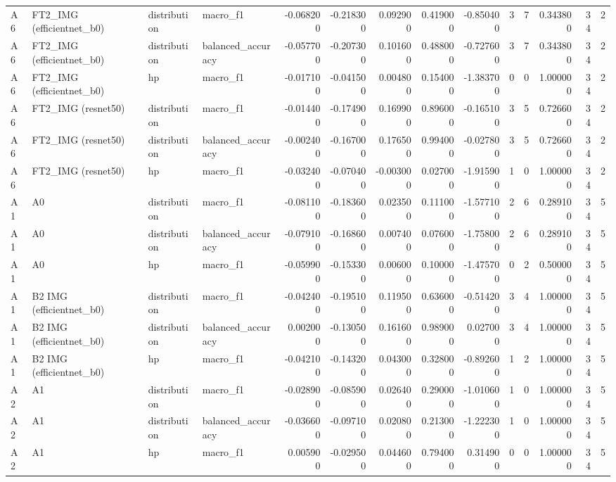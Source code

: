 \begin{table}
\begin{tabular}{llllrrrrrrrrrr}
A6 & FT2\_IMG (efficientnet\_b0) & distribution & macro\_f1 & -0.068200 & -0.218300 & 0.092900 & 0.419000 & -0.850400 & 3 & 7 & 0.343800 & 34 & 2 \\
A6 & FT2\_IMG (efficientnet\_b0) & distribution & balanced\_accuracy & -0.057700 & -0.207300 & 0.101600 & 0.488000 & -0.727600 & 3 & 7 & 0.343800 & 34 & 2 \\
A6 & FT2\_IMG (efficientnet\_b0) & hp & macro\_f1 & -0.017100 & -0.041500 & 0.004800 & 0.154000 & -1.383700 & 0 & 0 & 1.000000 & 34 & 2 \\
A6 & FT2\_IMG (resnet50) & distribution & macro\_f1 & -0.014400 & -0.174900 & 0.169900 & 0.896000 & -0.165100 & 3 & 5 & 0.726600 & 34 & 2 \\
A6 & FT2\_IMG (resnet50) & distribution & balanced\_accuracy & -0.002400 & -0.167000 & 0.176500 & 0.994000 & -0.027800 & 3 & 5 & 0.726600 & 34 & 2 \\
A6 & FT2\_IMG (resnet50) & hp & macro\_f1 & -0.032400 & -0.070400 & -0.003000 & 0.027000 & -1.915900 & 1 & 0 & 1.000000 & 34 & 2 \\
A1 & A0 & distribution & macro\_f1 & -0.081100 & -0.183600 & 0.023500 & 0.111000 & -1.577100 & 2 & 6 & 0.289100 & 34 & 5 \\
A1 & A0 & distribution & balanced\_accuracy & -0.079100 & -0.168600 & 0.007400 & 0.076000 & -1.758000 & 2 & 6 & 0.289100 & 34 & 5 \\
A1 & A0 & hp & macro\_f1 & -0.059900 & -0.153300 & 0.006000 & 0.100000 & -1.475700 & 0 & 2 & 0.500000 & 34 & 5 \\
A1 & B2 IMG (efficientnet\_b0) & distribution & macro\_f1 & -0.042400 & -0.195100 & 0.119500 & 0.636000 & -0.514200 & 3 & 4 & 1.000000 & 34 & 5 \\
A1 & B2 IMG (efficientnet\_b0) & distribution & balanced\_accuracy & 0.002000 & -0.130500 & 0.161600 & 0.989000 & 0.027000 & 3 & 4 & 1.000000 & 34 & 5 \\
A1 & B2 IMG (efficientnet\_b0) & hp & macro\_f1 & -0.042100 & -0.143200 & 0.043000 & 0.328000 & -0.892600 & 1 & 2 & 1.000000 & 34 & 5 \\
A2 & A1 & distribution & macro\_f1 & -0.028900 & -0.085900 & 0.026400 & 0.290000 & -1.010600 & 1 & 0 & 1.000000 & 34 & 5 \\
A2 & A1 & distribution & balanced\_accuracy & -0.036600 & -0.097100 & 0.020800 & 0.213000 & -1.222300 & 1 & 0 & 1.000000 & 34 & 5 \\
A2 & A1 & hp & macro\_f1 & 0.005900 & -0.029500 & 0.044600 & 0.794000 & 0.314900 & 0 & 0 & 1.000000 & 34 & 5 \\

\end{tabular}
\end{table}
